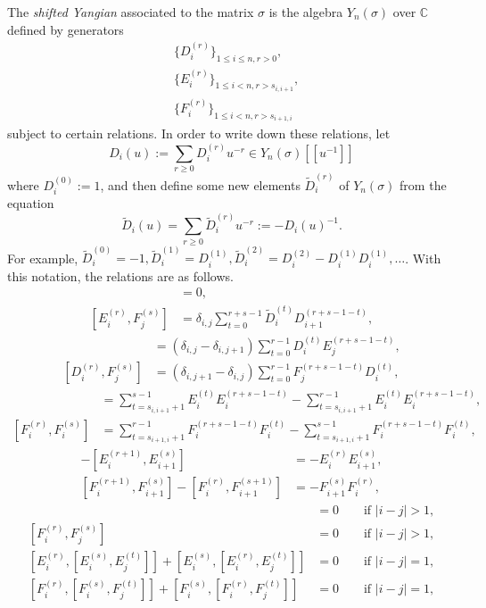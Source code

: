 \documentclass[twoside,12pt,reqno]{amsart}
\def\C{{\mathbb C}}
\begin{document}
The {\em shifted Yangian} associated to the matrix $\sigma$
is the algebra $Y_n(\sigma)$ over $\C$
defined by generators 
\begin{align*}
&\{D_i^{(r)}\}_{1 \leq i \leq n, r > 0},\\
&\{E_i^{(r)}\}_{1 \leq i < n, r > s_{i,i+1}},\\
&\{F_i^{(r)}\}_{1 \leq i < n, r > s_{i+1,i}}
\end{align*}
subject to 
certain relations.
In order to write down these relations,
let 
\begin{equation}\label{didef}
D_i(u) := \sum_{r \geq 0} D_i^{(r)} u^{-r}
\in Y_n(\sigma)[[u^{-1}]]
\end{equation}
where $D_i^{(0)} := 1$, and then
define some  new elements $\widetilde{D}_i^{(r)}$ of $Y_n(\sigma)$
from the equation
\begin{equation}
\widetilde{D}_i(u) =
\sum_{r \geq 0} \widetilde{D}_i^{(r)}u^{-r}
:=-D_i(u)^{-1}.
\end{equation}
For example, $\widetilde{D}_i^{(0)} = -1, 
\widetilde{D}_i^{(1)} = D_i^{(1)},
\widetilde{D}_i^{(2)} = D_i^{(2)}-D_i^{(1)} D_i^{(1)},\dots$.
With this notation, the relations are as follows.
\begin{align}
[D_i^{(r)}, D_j^{(s)}] &=  0,\label{r2}\\
[E_i^{(r)}, F_j^{(s)}] &= \delta_{i,j} 
\sum_{t=0}^{r+s-1} \widetilde D_{i}^{(t)}D_{i+1}^{(r+s-1-t)} ,\label{r3}
\end{align}\begin{align}
[D_i^{(r)}, E_j^{(s)}] &= (\delta_{i,j}-\delta_{i,j+1})
\sum_{t=0}^{r-1} D_i^{(t)} E_j^{(r+s-1-t)},\label{r4}\\
[D_i^{(r)}, F_j^{(s)}] &= (\delta_{i,j+1}-\delta_{i,j})
\sum_{t=0}^{r-1} F_j^{(r+s-1-t)}D_i^{(t)} ,\label{r5}\end{align}\begin{align}
[E_i^{(r)}, E_i^{(s)}] &=
\sum_{t=s_{i,i+1}+1}^{s-1} E_i^{(t)} E_i^{(r+s-1-t)}
-\sum_{t=s_{i,i+1}+1}^{r-1} E_i^{(t)} E_i^{(r+s-1-t)},\label{r6}\\
[F_i^{(r)}, F_i^{(s)}] &=
\sum_{t=s_{i+1,i}+1}^{r-1} F_i^{(r+s-1-t)} F_i^{(t)}-
\sum_{t=s_{i+1,i}+1}^{s-1} 
F_i^{(r+s-1-t)} F_i^{(t)},\label{r7}\end{align}\begin{align}
 [E_i^{(r)}, E_{i+1}^{(s+1)}]- [E_i^{(r+1)}, E_{i+1}^{(s)}] &=
-E_i^{(r)} E_{i+1}^{(s)},\label{r8}\\
[F_i^{(r+1)}, F_{i+1}^{(s)}] - [F_i^{(r)}, F_{i+1}^{(s+1)}] &=
 -F_{i+1}^{(s)} F_i^{(r)},\label{r9}\end{align}\begin{align}
[E_i^{(r)}, E_j^{(s)}] &= 0 \qquad\text{if }|i-j|> 1,\label{r10}\\
[F_i^{(r)}, F_j^{(s)}] &= 0 \qquad\text{if }|i-j|> 1,\label{r11}\\
[E_i^{(r)}, [E_i^{(s)}, E_j^{(t)}]] + 
[E_i^{(s)}, [E_i^{(r)}, E_j^{(t)}]] &= 0 \qquad\text{if }|i-j|=1,\label{r12}\\
[F_i^{(r)}, [F_i^{(s)}, F_j^{(t)}]] + 
[F_i^{(s)}, [F_i^{(r)}, F_j^{(t)}]] &= 0 \qquad\text{if }|i-j|=1,\label{r13}
\end{align}
\end{document}
